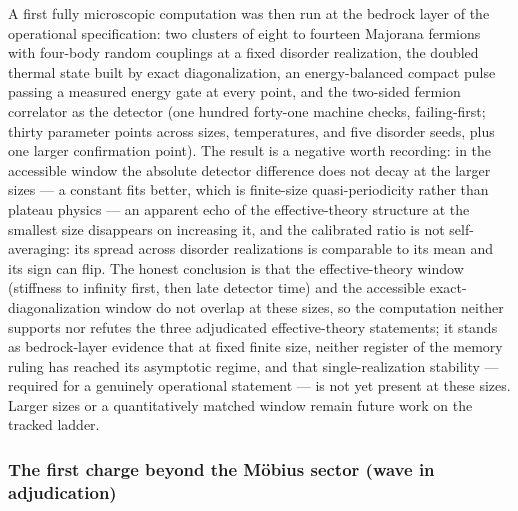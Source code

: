 A first fully microscopic computation was then run at the bedrock layer
of the operational specification: two clusters of eight to fourteen
Majorana fermions with four-body random couplings at a fixed disorder
realization, the doubled thermal state built by exact diagonalization,
an energy-balanced compact pulse passing a measured energy gate at every
point, and the two-sided fermion correlator as the detector
(one hundred forty-one machine checks, failing-first; thirty parameter
points across sizes, temperatures, and five disorder seeds, plus one
larger confirmation point).  The result is a negative worth recording:
in the accessible window the absolute detector difference does not decay
at the larger sizes --- a constant fits better, which is finite-size
quasi-periodicity rather than plateau physics --- an apparent echo of
the effective-theory structure at the smallest size disappears on
increasing it, and the calibrated ratio is not self-averaging: its
spread across disorder realizations is comparable to its mean and its
sign can flip.  The honest conclusion is that the effective-theory
window (stiffness to infinity first, then late detector time) and the
accessible exact-diagonalization window do not overlap at these sizes,
so the computation neither supports nor refutes the three adjudicated
effective-theory statements; it stands as bedrock-layer evidence that at
fixed finite size, neither register of the memory ruling has reached its
asymptotic regime, and that single-realization stability --- required
for a genuinely operational statement --- is not yet present at these
sizes.  Larger sizes or a quantitatively matched window remain future
work on the tracked ladder.

\subsubsection*{The first charge beyond the Möbius sector (wave in
adjudication)}

